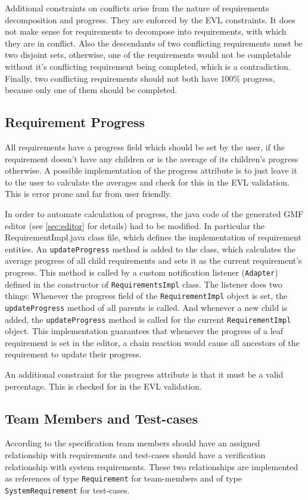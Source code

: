 \documentclass[11pt,a4paper]{article}
\begin{document}
	Additional constraints on conflicts arise from the nature of requirements decomposition and progress. They are enforced by the EVL constraints. It does not make sense for requirements to decompose into requirements, with which they are in conflict. Also the descendants of two conflicting requirements must be two disjoint sets, otherwise, one of the requirements would not be completable without it's conflicting requirement being completed, which is a contradiction. Finally, two conflicting requirements should not both have 100\% progress, because only one of them should be completed.
	
	\subsection{Requirement Progress} \label{sec:progress}
	All requirements have a progress field which should be set by the user, if the requirement doesn't have any children or is the average of its children's progress otherwise. A possible implementation of the progress attribute is to just leave it to the user to calculate the averages and check for this in the EVL validation. This is error prone and far from user friendly. 
	
	In order to automate calculation of progress, the java code of the generated GMF editor (see \autoref{sec:editor} for details) had to be modified. In particular the RequirementImpl.java class file, which defines the implementation of requirement entities. An \texttt{updateProgress} method is added to the class, which calculates the average progress of all child requirements and sets it as the current requirement's progress. This method is called by a custom notification listener (\texttt{Adapter}) defined in the constructor of \texttt{RequirementsImpl} class. The listener does two things: Whenever the progress field of the \texttt{RequirementImpl} object is set, the \texttt{updateProgress} method of all parents is called. And whenever a new child is added, the \texttt{updateProgress} method is called for the current \texttt{RequirementImpl} object. This implementation guarantees that whenever the progress of a leaf requirement is set in the editor, a chain reaction would cause all ancestors of the requirement to update their progress.

	An additional constraint for the progress attribute is that it must be a valid percentage. This is checked for in the EVL validation.
	
	\subsection{Team Members and Test-cases}
	According to the specification team members should have an assigned relationship with requirements and test-cases should have a verification relationship with system requirements. These two relationships are implemented as references of type \texttt{Requirement} for team-members and of type \texttt{SystemRequirement} for test-cases. 
	
\end{document}
